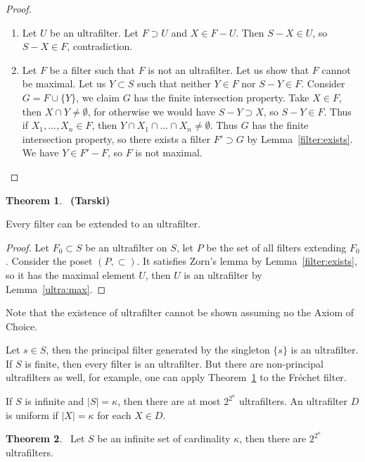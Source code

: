 \documentclass[8pt]{article}
\theoremstyle{definition}
\theoremstyle{definition}
\newtheorem{theorem}{Theorem}[section]
\theoremstyle{definition}
\theoremstyle{definition}
\theoremstyle{definition}
\theoremstyle{definition}
\theoremstyle{definition}
\theoremstyle{definition}
\theoremstyle{definition}
\theoremstyle{definition}
\theoremstyle{definition}
\theoremstyle{definition}
\theoremstyle{definition}
\theoremstyle{definition}
\theoremstyle{question}
\begin{document}
\begin{proof}
  $ $

  \begin{enumerate}
    \item Let $U$ be an ultrafilter. Let $F \supset U$ and $X \in F - U$. Then $S - X \in U$, so $S - X \in F$, contradiction.
    \item Let $F$ be a filter such that $F$ is not an ultrafilter. Let us show that $F$ cannot be maximal.
    Let us $Y \subset S$ such that neither $Y \in F$ nor $S - Y \in F$. 
    Consider $G = F \cup \{ Y\}$, we claim $G$ has the finite intersection property.
    Take $X \in F$, then $X \cap Y \neq \emptyset$, for otherwise we would have $S - Y \supset X$, so $S - Y \in F$.
    Thus if $X_1, \dots, X_n \in F$, then $Y \cap X_1 \cap \dots \cap X_n \neq \emptyset$. 
    Thus $G$ has the finite intersection property, so there exists a filter $F' \supset G$ by Lemma~\ref{filter:exists}. 
    We have $Y \in F' - F$, so $F$ is not maximal.
  \end{enumerate}
\end{proof}

\begin{theorem}~\label{existence} {\bf (Tarski)}

  Every filter can be extended to an ultrafilter.
\end{theorem}

\begin{proof}
  Let $F_0 \subset S$ be an ultrafilter on $S$, let $P$ be the set of all filters extending $F_0$. 
  Consider the poset $(P, \subset)$. It satisfies Zorn's lemma by Lemma~\ref{filter:exists}, so it has
  the maximal element $U$, then $U$ is an ultrafilter by Lemma~\ref{ultra:max}.
\end{proof}
Note that the existence of ultrafilter cannot be shown assuming no the Axiom of Choice. 

Let $s \in S$, then the principal filter generated by the singleton $\{s\}$ is an ultrafilter.
If $S$ is finite, then every filter is an ultrafilter. But there are non-principal ultrafilters as well, for example,
one can apply Theorem~\ref{existence} to the Fr\'{e}chet filter.

If $S$ is infinite and $|S| = \kappa$, then there are at most $2^{2^{\kappa}}$ ultrafilters. 
An ultrafilter $D$ is uniform if $|X| = \kappa$ for each $X \in D$.

\begin{theorem}~\label{how:many:ultra}
  Let $S$ be an infinite set of cardinality $\kappa$, then there are $2^{2^{\kappa}}$ ultrafilters.
\end{theorem}
\end{document}
